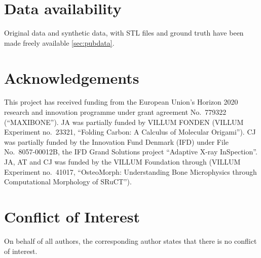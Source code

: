 \section{Data availability}

Original data and synthetic data, with STL files and ground truth have been
made freely available \ref{sec:pubdata}.

\section{Acknowledgements}

This project has received funding from the European Union’s Horizon 2020
research and innovation programme under grant agreement No.~779322
(``MAXIBONE'').  JA was partially funded by VILLUM FONDEN (VILLUM Experiment
no.~23321, “Folding Carbon: A Calculus of Molecular Origami”).  CJ was partially
funded by the Innovation Fund Denmark (IFD) under File No.~8057-00012B, the IFD
Grand Solutions project ``Adaptive X-ray InSpection''.  JA, AT and CJ was funded
by the VILLUM Foundation through (VILLUM Experiment no.~41017, “OsteoMorph:
Understanding Bone Microphysics through Computational Morphology of SRuCT”).

\section{Conflict of Interest}
On behalf of all authors, the corresponding author states that there is no
conflict of interest.

